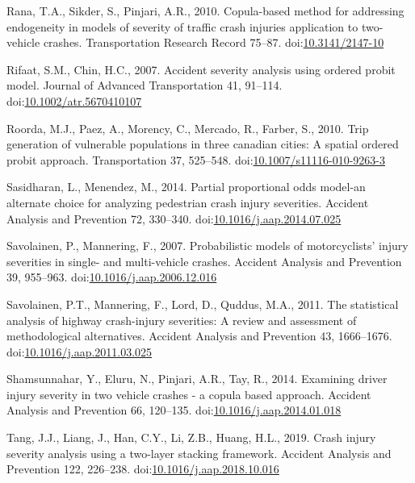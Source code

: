 \documentclass[]{elsarticle} %
\begin{document}
\leavevmode\hypertarget{ref-Rana2010copula}{}%
Rana, T.A., Sikder, S., Pinjari, A.R., 2010. Copula-based method for
addressing endogeneity in models of severity of traffic crash injuries
application to two-vehicle crashes. Transportation Research Record
75--87. doi:\href{https://doi.org/10.3141/2147-10}{10.3141/2147-10}

\leavevmode\hypertarget{ref-Rifaat2007accident}{}%
Rifaat, S.M., Chin, H.C., 2007. Accident severity analysis using ordered
probit model. Journal of Advanced Transportation 41, 91--114.
doi:\href{https://doi.org/10.1002/atr.5670410107}{10.1002/atr.5670410107}

\leavevmode\hypertarget{ref-Roorda2010trip}{}%
Roorda, M.J., Paez, A., Morency, C., Mercado, R., Farber, S., 2010. Trip
generation of vulnerable populations in three canadian cities: A spatial
ordered probit approach. Transportation 37, 525--548.
doi:\href{https://doi.org/10.1007/s11116-010-9263-3}{10.1007/s11116-010-9263-3}

\leavevmode\hypertarget{ref-Sasidharan2014partial}{}%
Sasidharan, L., Menendez, M., 2014. Partial proportional odds model-an
alternate choice for analyzing pedestrian crash injury severities.
Accident Analysis and Prevention 72, 330--340.
doi:\href{https://doi.org/10.1016/j.aap.2014.07.025}{10.1016/j.aap.2014.07.025}

\leavevmode\hypertarget{ref-Savolainen2007probabilistic}{}%
Savolainen, P., Mannering, F., 2007. Probabilistic models of
motorcyclists' injury severities in single- and multi-vehicle crashes.
Accident Analysis and Prevention 39, 955--963.
doi:\href{https://doi.org/10.1016/j.aap.2006.12.016}{10.1016/j.aap.2006.12.016}

\leavevmode\hypertarget{ref-Savolainen2011statistical}{}%
Savolainen, P.T., Mannering, F., Lord, D., Quddus, M.A., 2011. The
statistical analysis of highway crash-injury severities: A review and
assessment of methodological alternatives. Accident Analysis and
Prevention 43, 1666--1676.
doi:\href{https://doi.org/10.1016/j.aap.2011.03.025}{10.1016/j.aap.2011.03.025}

\leavevmode\hypertarget{ref-Shamsunnahar2014examining}{}%
Shamsunnahar, Y., Eluru, N., Pinjari, A.R., Tay, R., 2014. Examining
driver injury severity in two vehicle crashes - a copula based approach.
Accident Analysis and Prevention 66, 120--135.
doi:\href{https://doi.org/10.1016/j.aap.2014.01.018}{10.1016/j.aap.2014.01.018}

\leavevmode\hypertarget{ref-Tang2019crash}{}%
Tang, J.J., Liang, J., Han, C.Y., Li, Z.B., Huang, H.L., 2019. Crash
injury severity analysis using a two-layer stacking framework. Accident
Analysis and Prevention 122, 226--238.
doi:\href{https://doi.org/10.1016/j.aap.2018.10.016}{10.1016/j.aap.2018.10.016}
\end{document}
